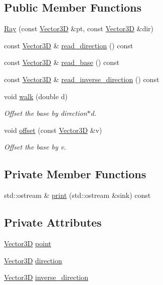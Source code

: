 \subsection*{Public Member Functions}
\begin{DoxyCompactItemize}
\item 
\hyperlink{classRay_a9fad894cf932e40e035eb93ed880577b}{Ray} (const \hyperlink{classVector3D}{Vector3D} \&pt, const \hyperlink{classVector3D}{Vector3D} \&dir)
\item 
const \hyperlink{classVector3D}{Vector3D} \& \hyperlink{classRay_ae18a3d51cd5b0a57bd47a0a1f79e7d2d}{read\+\_\+direction} () const 
\item 
const \hyperlink{classVector3D}{Vector3D} \& \hyperlink{classRay_a07aaea95760db6dcc39f87308d9470a1}{read\+\_\+base} () const 
\item 
const \hyperlink{classVector3D}{Vector3D} \& \hyperlink{classRay_a04e28c7802e92e999591aac71c04fa8f}{read\+\_\+inverse\+\_\+direction} () const 
\item 
void \hyperlink{classRay_af986618fceed92c3c189f8950deb6d21}{walk} (double d)
\begin{DoxyCompactList}\small\item\em Offset the base by direction$\ast$d. \end{DoxyCompactList}\item 
void \hyperlink{classRay_ab5669d08ac75473d52cb4e0ade79b6c1}{offset} (const \hyperlink{classVector3D}{Vector3D} \&v)
\begin{DoxyCompactList}\small\item\em Offset the base by v. \end{DoxyCompactList}\end{DoxyCompactItemize}
\subsection*{Private Member Functions}
\begin{DoxyCompactItemize}
\item 
std\+::ostream \& \hyperlink{classRay_a6b11813671e6296448ff9abafaa82b31}{print} (std\+::ostream \&sink) const 
\end{DoxyCompactItemize}
\subsection*{Private Attributes}
\begin{DoxyCompactItemize}
\item 
\hyperlink{classVector3D}{Vector3D} \hyperlink{classRay_a35cd5ddd116f79b927e5ce1dfaca64c7}{point}
\item 
\hyperlink{classVector3D}{Vector3D} \hyperlink{classRay_afe8cae110601e8ece9edd45ba500c2d0}{direction}
\item 
\hyperlink{classVector3D}{Vector3D} \hyperlink{classRay_a58bfdb8ab63bad3882999e5d2113a927}{inverse\+\_\+direction}
\end{DoxyCompactItemize}
